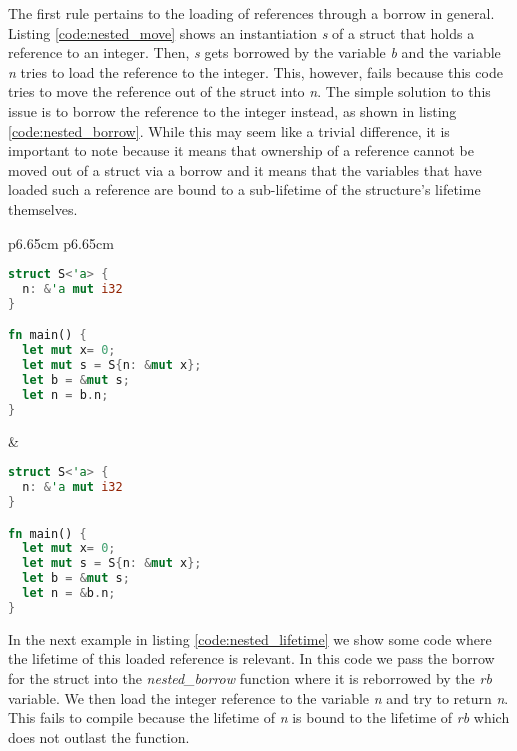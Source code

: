 The first rule pertains to the loading of references through a borrow in general.
Listing \ref{code:nested_move} shows an instantiation \textit{s} of a struct that holds a reference to an integer.
Then, \textit{s} gets borrowed by the variable \textit{b} and the variable \textit{n} tries to load the reference to the integer.
This, however, fails because this code tries to move the reference out of the struct into \textit{n}.
The simple solution to this issue is to borrow the reference to the integer instead, as shown in listing \ref{code:nested_borrow}.
While this may seem like a trivial difference, it is important to note because it means that ownership of a reference cannot be moved out of a struct via a borrow and it means that the variables that have loaded such a reference are bound to a sub-lifetime of the structure's lifetime themselves.
\begin{tabular}{p{6.65cm} p{6.65cm}}
    \begin{lstlisting}[language=Rust,frame=single,caption=Move reference,label=code:nested_move]
struct S<'a> {
  n: &'a mut i32
}

fn main() {
  let mut x= 0;
  let mut s = S{n: &mut x};
  let b = &mut s;
  let n = b.n;
}
    \end{lstlisting}

    &

    \begin{lstlisting}[language=Rust,frame=single,caption=Borrow reference,label=code:nested_borrow]
struct S<'a> {
  n: &'a mut i32
}

fn main() {
  let mut x= 0;
  let mut s = S{n: &mut x};
  let b = &mut s;
  let n = &b.n;
}
    \end{lstlisting}
\end{tabular}

In the next example in listing \ref{code:nested_lifetime} we show some code where the lifetime of this loaded reference is relevant.
In this code we pass the borrow for the struct into the \textit{nested\_borrow} function where it is reborrowed by the \textit{rb} variable.
We then load the integer reference to the variable \textit{n} and try to return \textit{n}.
This fails to compile because the lifetime of \textit{n} is bound to the lifetime of \textit{rb} which does not outlast the function.

